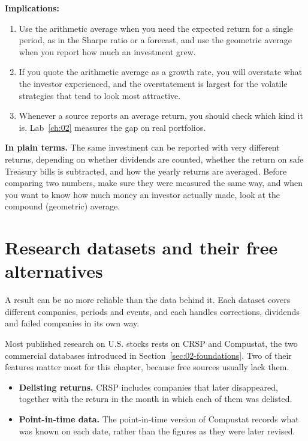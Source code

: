 \textbf{Implications:}
\begin{enumerate}
\item Use the arithmetic average when you need the expected return for a single period, as in the Sharpe ratio or a forecast, and use the geometric average when you report how much an investment grew. 
\item If you quote the arithmetic average as a growth rate, you will overstate what the investor experienced, and the overstatement is largest for the volatile strategies that tend to look most attractive. 
\item Whenever a source reports an average return, you should check which kind it is. Lab~\ref{ch:02} measures the gap on real portfolios.
\end{enumerate}

\noindent\textbf{In plain terms.} The same investment can be reported with very different returns, depending on whether dividends are counted, whether the return on safe Treasury bills is subtracted, and how the yearly returns are averaged. Before comparing two numbers, make sure they were measured the same way, and when you want to know how much money an investor actually made, look at the compound (geometric) average.

\section{Research datasets and their free alternatives}
\label{sec:02-datasets}

A result can be no more reliable than the data behind it. Each dataset covers different companies, periods and events, and each handles corrections, dividends and failed companies in its own way. 

Most published research on U.S. stocks rests on CRSP and Compustat, the two commercial databases introduced in Section~\ref{sec:02-foundations}. Two of their features matter most for this chapter, because free sources usually lack them.

\begin{itemize}
  \item \textbf{Delisting returns.} CRSP includes companies that later disappeared, together with the return in the month in which each of them was delisted.
  \item \textbf{Point-in-time data.} The point-in-time version of Compustat records what was known on each date, rather than the figures as they were later revised.
\end{itemize}

